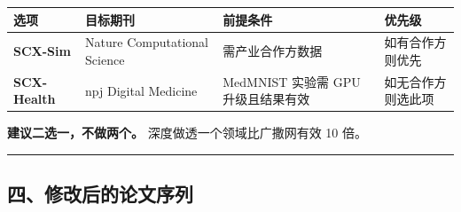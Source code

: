 \documentclass[
  12pt,
]{ctexart}
\begin{document}
\begin{longtable}[]{@{}
  >{\raggedright\arraybackslash}p{}
  >{\raggedright\arraybackslash}p{}
  >{\raggedright\arraybackslash}p{}
  >{\raggedright\arraybackslash}p{}@{}}
\toprule\noalign{}
\begin{minipage}[b]{\linewidth}\raggedright
选项
\end{minipage} & \begin{minipage}[b]{\linewidth}\raggedright
目标期刊
\end{minipage} & \begin{minipage}[b]{\linewidth}\raggedright
前提条件
\end{minipage} & \begin{minipage}[b]{\linewidth}\raggedright
优先级
\end{minipage} \\
\midrule\noalign{}
\endhead
\bottomrule\noalign{}
\endlastfoot
\textbf{SCX-Sim} & Nature Computational Science & 需产业合作方数据 &
如有合作方则优先 \\
\textbf{SCX-Health} & npj Digital Medicine & MedMNIST 实验需 GPU
升级且结果有效 & 如无合作方则选此项 \\
\end{longtable}

\textbf{建议二选一，不做两个。} 深度做透一个领域比广撒网有效 10 倍。

\begin{center}\rule{0.5\linewidth}{0.5pt}\end{center}

\subsection{四、修改后的论文序列}\label{ux56dbux4feeux6539ux540eux7684ux8bbaux6587ux5e8fux5217}
\end{document}
